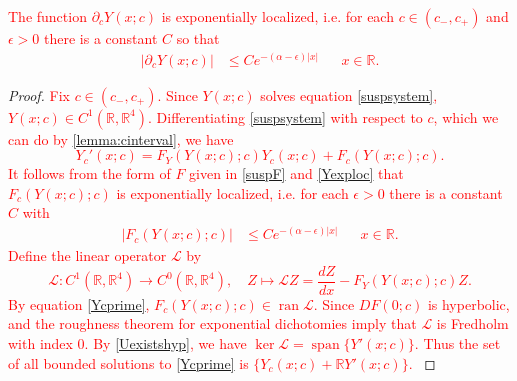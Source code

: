 \documentclass[review,onefignum,onetabnum]{siamart171218}
\newcommand{\R}{\mathbb{R}}
\def\ker{\mathop\mathrm{ker}\nolimits}
\def\Ran{\mathop\mathrm{ran}\nolimits}
\def\Span{\mathop\mathrm{span}\nolimits}
\newcommand{\calL}{\mathcal{L}}
\newcommand{\revised}[1]{ \textcolor{red}{#1} }
\begin{document}
\begin{lemma}\label{lemma:Ycexploc}
\revised{
The function $\partial_c Y(x; c)$ is exponentially localized, i.e. for each $c \in (c_-, c_+)$ and $\epsilon > 0$ there is a constant $C$ so that
\begin{align}\label{Ycexploc}
|\partial_c Y(x; c)| &\leq C e^{-(\alpha - \epsilon)|x|} && x \in \R.
\end{align}
}
\begin{proof}
\revised{
Fix $c \in (c_-, c_+)$. Since $Y(x; c)$ solves equation \cref{suspsystem}, $Y(x; c) \in C^1(\R, \R^4)$. Differentiating \cref{suspsystem} with respect to $c$, which we can do by \cref{lemma:cinterval}, we have
\begin{equation}\label{Ycprime}
Y_c'(x; c) = F_Y(Y(x;c); c) Y_c(x; c) + F_c(Y(x;c); c).
\end{equation}
It follows from the form of $F$ given in \cref{suspF} and \cref{Yexploc} that $F_c(Y(x;c); c)$ is exponentially localized, i.e. for each $\epsilon > 0$ there is a constant $C$ with
\begin{align}\label{Fcexploc}
|F_c(Y(x;c); c)| &\leq C e^{-(\alpha - \epsilon)|x|} && x \in \R.
\end{align}
Define the linear operator $\calL$ by
\begin{equation}\label{suspdefL}
\calL: C^1(\R, \R^4) \to C^0(\R, \R^4),\quad
Z \mapsto \calL Z = \frac{dZ}{dx} - F_Y(Y(x;c); c) Z.
\end{equation}
By equation \cref{Ycprime}, $F_c(Y(x;c); c) \in \Ran \calL$. Since $DF(0; c)$ is hyperbolic, \cite[Lemma~4.2]{Palmer1984} and the roughness theorem for exponential dichotomies \cite{Coppel1978} imply that $\calL$ is Fredholm with index 0. By \cref{Uexistshyp}, we have $\ker \calL = \Span\{Y'(x; c)\}$. Thus the set of all bounded solutions to \cref{Ycprime} is $\{Y_c(x; c) + \R Y'(x; c)\}$.
}


\end{proof}
\end{lemma}
\end{document}

